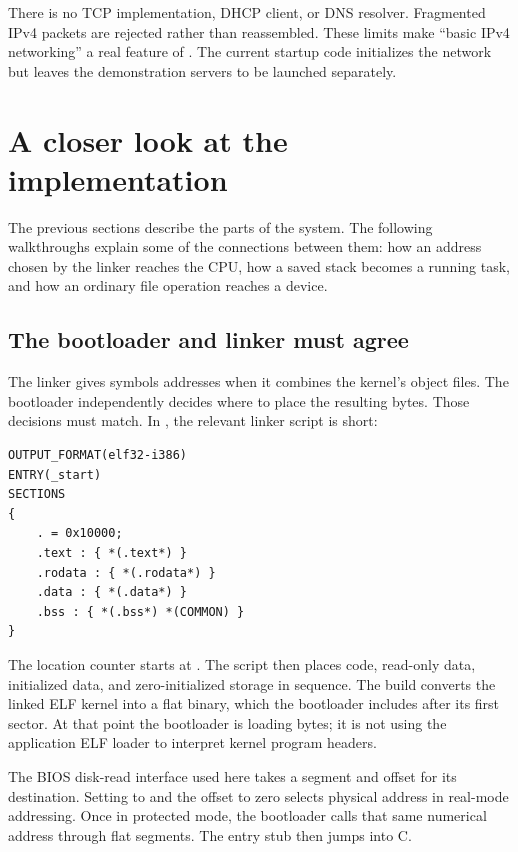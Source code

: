 \documentclass[11pt,a4paper]{scrartcl}
\newcommand{\code}[1]{\texttt{\detokenize{#1}}}
\begin{document}
There is no TCP implementation, DHCP client, or DNS resolver. Fragmented
IPv4 packets are rejected rather than reassembled. These limits make
``basic IPv4 networking'' a real feature of \code{mboot}. The current
startup code initializes the network but leaves the demonstration servers
to be launched separately.


\section{A closer look at the implementation}
\label{sec:walkthrough}

The previous sections describe the parts of the system. The following
walkthroughs explain some of the connections between them: how an address
chosen by the linker reaches the CPU, how a saved stack becomes a running
task, and how an ordinary file operation reaches a device.

\subsection{The bootloader and linker must agree}

The linker gives symbols addresses when it combines the kernel's object
files. The bootloader independently decides where to place the resulting
bytes. Those decisions must match. In \code{mboot}, the relevant linker
script is short:

\par\medskip
\noindent\begin{minipage}{\linewidth}
\begin{lstlisting}[caption={The kernel linker script, link.ld.}]
OUTPUT_FORMAT(elf32-i386)
ENTRY(_start)
SECTIONS
{
    . = 0x10000;
    .text : { *(.text*) }
    .rodata : { *(.rodata*) }
    .data : { *(.data*) }
    .bss : { *(.bss*) *(COMMON) }
}
\end{lstlisting}
\end{minipage}
\par\medskip

The location counter starts at \code{0x10000}. The script then places code,
read-only data, initialized data, and zero-initialized storage in sequence.
The build converts the linked ELF kernel into a flat binary, which the
bootloader includes after its first sector. At that point the bootloader
is loading bytes; it is not using the application ELF loader to interpret
kernel program headers.

The BIOS disk-read interface used here takes a segment and offset for its
destination. Setting \code{ES} to \code{0x1000} and the offset to zero
selects physical address \code{0x10000} in real-mode addressing. Once in
protected mode, the bootloader calls that same numerical address through
flat segments. The entry stub then jumps into C.
\end{document}
